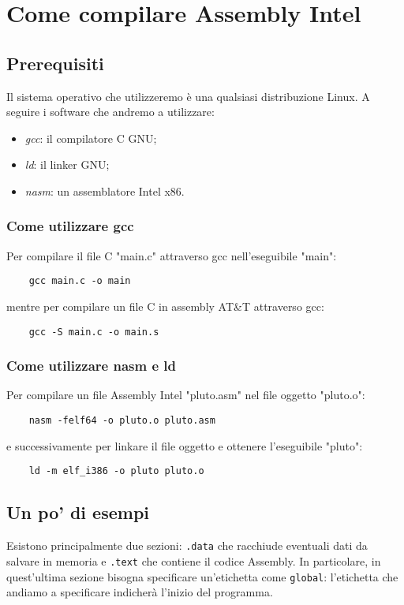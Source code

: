 \documentclass[class=book, crop=false, oneside]{standalone}
\begin{document}
\chapter{Come compilare Assembly Intel}

\section{Prerequisiti}
Il sistema operativo che utilizzeremo è una qualsiasi distribuzione Linux. A seguire i software che andremo a utilizzare:
\begin{itemize}
	\item \emph{\acrfull{gcc}}: il compilatore C GNU;
	\item \emph{ld}: il linker GNU;
	\item \emph{nasm}: un assemblatore Intel x86.
\end{itemize}

\subsection{Come utilizzare \acrshort{gcc}}
Per compilare il file C "main.c" attraverso \acrshort{gcc} nell'eseguibile "main":
\begin{verbatim}
	gcc main.c -o main
\end{verbatim}
mentre per compilare un file C in assembly AT\&T attraverso \acrshort{gcc}:
\begin{verbatim}
	gcc -S main.c -o main.s
\end{verbatim}

\subsection{Come utilizzare nasm e ld}
Per compilare un file Assembly Intel "pluto.asm" nel file oggetto "pluto.o":
\begin{verbatim}
	nasm -felf64 -o pluto.o pluto.asm
\end{verbatim}
e successivamente per linkare il file oggetto e ottenere l'eseguibile "pluto":
\begin{verbatim}
	ld -m elf_i386 -o pluto pluto.o
\end{verbatim}

\section{Un po' di esempi}
Esistono principalmente due sezioni: \texttt{.data} che racchiude eventuali dati da salvare in memoria e \texttt{.text} che contiene il codice Assembly. In particolare, in quest'ultima sezione bisogna specificare un'etichetta come \texttt{global}: l'etichetta che andiamo a specificare indicherà l'inizio del programma.
\end{document}
